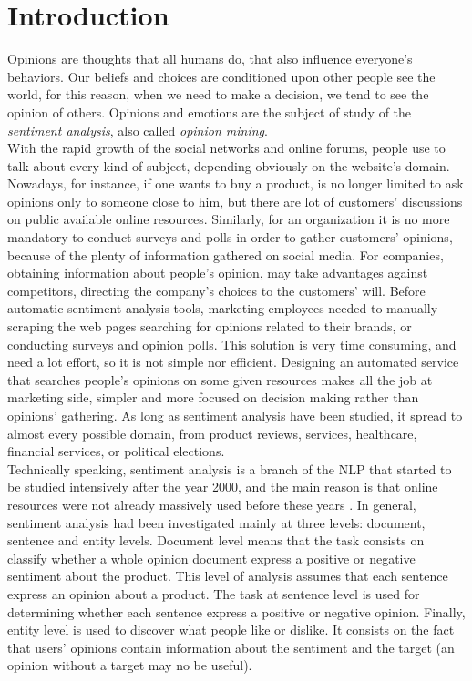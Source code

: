 \chapter{Introduction}
\label{introduction}

Opinions are thoughts that all humans do, that also influence everyone's behaviors. Our beliefs and choices are conditioned upon other people see the world, for this reason, when we need to make a decision, we tend to see the opinion of others. Opinions and emotions are the subject of study of the \textit{sentiment analysis}, also called \textit{opinion mining}.\\
With the rapid growth of the social networks and online forums, people use to talk about every kind of subject, depending obviously on the website's domain. Nowadays, for instance, if one wants to buy a product, is no longer limited to ask opinions only to someone close to him, but there are lot of customers' discussions on public available online resources. Similarly, for an organization it is no more mandatory to conduct surveys and polls in order to gather customers' opinions, because of the plenty of information gathered on social media. For companies, obtaining information about people's opinion, may take advantages against competitors, directing the company's choices to the customers' will. Before automatic sentiment analysis tools, marketing employees needed to manually scraping the web pages searching for opinions related to their brands, or conducting surveys and opinion polls. This solution is very time consuming, and need a lot effort, so it is not simple nor efficient. Designing an automated service that searches people's opinions on some given resources makes all the job at marketing side, simpler and more focused on decision making rather than opinions' gathering. As long as sentiment analysis have been studied, it spread to almost every possible domain, from product reviews, services, healthcare, financial services, or political elections.\\
Technically speaking, sentiment analysis is a branch of the \ac{NLP} that started to be studied intensively after the year 2000, and the main reason is that online resources were not already massively used before these years \cite{Liu:2012:SAO:3019323}. In general, sentiment analysis had been investigated mainly at three levels: document, sentence and entity levels. Document level means that the task consists on classify whether a whole opinion document express a positive or negative sentiment about the product. This level of analysis assumes that each sentence express an opinion about a product.  The task at sentence level is used for determining whether each sentence express a positive or negative opinion. Finally, entity level is used to discover what people like or dislike. It consists on the fact that users' opinions contain information about the sentiment and the target (an opinion without a target may no be useful).\\

